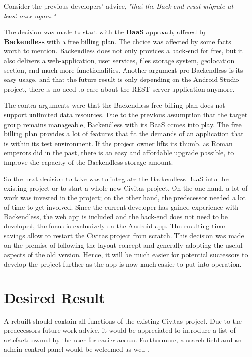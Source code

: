 Consider the previous developers' advice, \textit{"that the Back-end must migrate at least once again."} \cite[p. 51]{Ganapijev18}

The decision was made to start with the \textbf{BaaS} approach, offered by \textbf{Backendless} with a free billing plan. 
The choice was affected by some facts worth to mention.
Backendless does not only provides a back-end for free, but it also delivers a web-application, user services, files storage system, geolocation section, and much more functionalities. Another argument pro Backendless is its easy usage, and that the future result is only depending on the Android Studio project, there is no need to care about the REST server application anymore.

The contra arguments were that the Backendless free billing plan does not support unlimited data resources.
Due to the previous assumption that the target group remains manageable, Backendless with its BaaS comes into play. The free billing plan provides a lot of features that fit the demands of an application that is within its test environment. If the project owner lifts its thumb, as Roman emperors did in the past, there is an easy and affordable upgrade possible, to improve the capacity of the Backendless storage amount.

So the next decision to take was to integrate the Backendless BaaS into the existing project or to start a whole new Civitas project. 
On the one hand, a lot of work was invested in the project; on the other hand, the predecessor needed a lot of time to get involved. Since the current developer has gained experience with Backendless, the web app is included and the back-end does not need to be developed, the focus is exclusively on the Android app. The resulting time savings allow to restart the Civitas project from scratch.
This decision was made on the premise of following the layout concept and generally adopting the useful aspects of the old version. Hence, it will be much easier for potential successors to develop the project further as the app is now much easier to put into operation.


\section{Desired Result}

A rebuilt should contain all functions of the existing Civitas project. 
Due to the predecessors future work advice, it would be appreciated to introduce a list of artefacts owned by the user for easier access. Furthermore, a search field and an admin control panel would be welcomed as well \cite[cf. p. 55]{Ganapijev18}.

